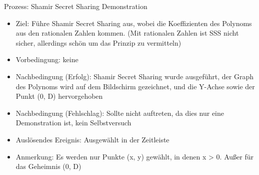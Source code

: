 \documentclass{article}
\begin{document}
\begin{FA}[start=900]
\item Prozess: Shamir Secret Sharing Demonstration
\end{FA}
\begin{itemize}[label={}]
    \item Ziel: Führe Shamir Secret Sharing
        aus, wobei die Koeffizienten des Polynoms
        aus den rationalen Zahlen kommen.
        (Mit rationalen Zahlen ist SSS nicht sicher,
        allerdings schön um das Prinzip zu vermitteln)
    \item Vorbedingung: keine
    \item Nachbedingung (Erfolg): Shamir Secret Sharing wurde
        ausgeführt, der Graph des Polynoms wird auf dem
        Bildschirm gezeichnet, und die Y-Achse
        sowie der Punkt (0, D) hervorgehoben
    \item Nachbedingung (Fehlschlag): Sollte nicht auftreten,
        da dies nur eine Demonstration ist, kein Selbstversuch
    \item Auslösendes Ereignis: Ausgewählt in der Zeitleiste
    \item Anmerkung: Es werden nur Punkte (x, y) gewählt,
        in denen x > 0. Außer für das Geheimnis (0, D)
\end{itemize}
\end{document}
